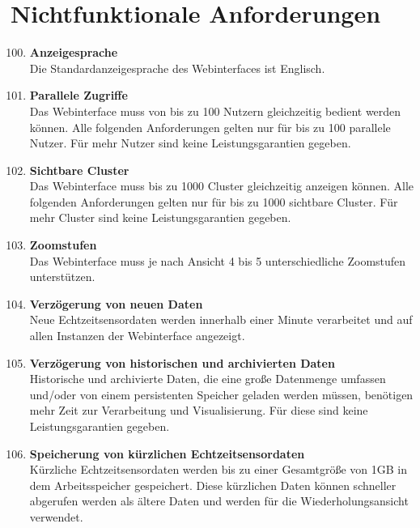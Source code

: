 \chapter{Nichtfunktionale Anforderungen}
\begin{enumerate}[label=\textbf{NF\arabic{enumi}0}]
	\setcounter{enumi}{99}
	
	\item \textbf{Anzeigesprache}\\
	Die Standardanzeigesprache des Webinterfaces ist Englisch.
	
	\item \textbf{Parallele Zugriffe}\\
	Das Webinterface muss von bis zu 100 Nutzern gleichzeitig bedient werden können. Alle folgenden Anforderungen gelten nur für bis zu 100 parallele Nutzer. Für mehr Nutzer sind keine Leistungsgarantien gegeben.
	
	\item \textbf{Sichtbare Cluster}\\
	Das Webinterface muss bis zu 1000 Cluster gleichzeitig anzeigen können. Alle folgenden Anforderungen gelten nur für bis zu 1000 sichtbare Cluster. Für mehr Cluster sind keine Leistungsgarantien gegeben.
	
	\item \textbf{Zoomstufen}\\
	Das Webinterface muss je nach Ansicht 4 bis 5 unterschiedliche Zoomstufen unterstützen.
	
	\item \textbf{Verzögerung von neuen Daten}\\
	Neue Echtzeitsensordaten werden innerhalb einer Minute verarbeitet und auf allen Instanzen der Webinterface angezeigt.
	
	\item \textbf{Verzögerung von historischen und archivierten Daten}\\
	Historische und archivierte Daten, die eine große Datenmenge umfassen und/oder von einem persistenten Speicher geladen werden müssen, benötigen mehr Zeit zur Verarbeitung und Visualisierung. Für diese sind keine Leistungsgarantien gegeben.
	
	\item \textbf{Speicherung von kürzlichen Echtzeitsensordaten}\\
	Kürzliche Echtzeitsensordaten werden bis zu einer Gesamtgröße von 1GB in dem Arbeitsspeicher gespeichert. Diese kürzlichen Daten können schneller abgerufen werden als ältere Daten und werden für die Wiederholungsansicht verwendet.
	

\end{enumerate}
